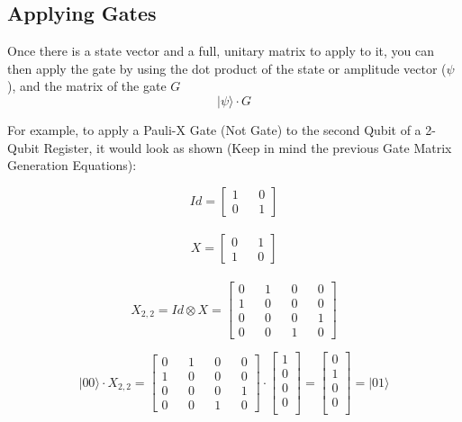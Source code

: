 \documentclass[../main.tex]{subfiles}
\begin{document}
\subsection{Applying Gates}
Once there is a state vector and a full, unitary matrix to apply to it,
you can then apply the gate by using the dot product of the state or amplitude vector (\(\psi\)), and the matrix of the gate \(G\) \\
\begin{equation}
	\lvert\psi\rangle \cdot G
\end{equation}

For example, to apply a Pauli-X Gate (Not Gate) to the second Qubit of a 2-Qubit Register, it would look as shown (Keep in mind the previous Gate Matrix Generation Equations):

$$
	Id = \left [\begin{matrix}
		1 && 0 \\
		0 && 1
	\end{matrix}\right]
$$
	\\
$$
	X = \left [\begin{matrix}
		0 && 1 \\
		1 && 0
	\end{matrix}\right]
$$
	\\
$$	
	X_{2,2} = Id \otimes X = \left [\begin{matrix}
		0 && 1 && 0 && 0 \\
		1 && 0 && 0 && 0 \\
		0 && 0 && 0 && 1 \\
		0 && 0 && 1 && 0
	\end{matrix}\right]
$$	

$$
\lvert00\rangle \cdot X_{2,2} = \left[\begin{matrix}
		0 && 1 && 0 && 0 \\
		1 && 0 && 0 && 0 \\
		0 && 0 && 0 && 1 \\
		0 && 0 && 1 && 0
\end{matrix}\right] \cdot \left[\begin{matrix}
	1 \\
	0 \\
	0 \\
	0 \\
\end{matrix}\right] = \left[\begin{matrix}
	0 \\
	1 \\
	0 \\
	0 \\
\end{matrix}\right] = \lvert01\rangle
$$
		
\end{document}
